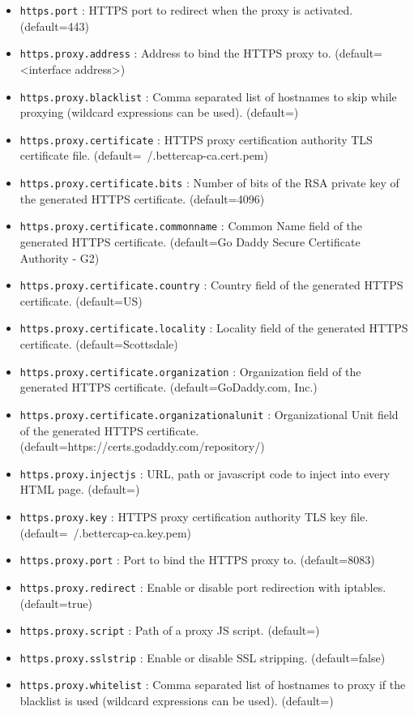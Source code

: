 \documentclass[status=normal,cover=tesi,language=en]{gmeepd}
\begin{document}
\begin{itemize}
 \item \verb|https.port| : HTTPS port to redirect when the proxy is activated. (default=443)
 \item \verb|https.proxy.address| : Address to bind the HTTPS proxy to. (default=<interface address>)
 \item \verb|https.proxy.blacklist| : Comma separated list of hostnames to skip while proxying (wildcard expressions can be used). (default=)
 \item \verb|https.proxy.certificate| : HTTPS proxy certification authority TLS certificate file. (default=~/.bettercap-ca.cert.pem)
 \item \verb|https.proxy.certificate.bits| : Number of bits of the RSA private key of the generated HTTPS certificate. (default=4096)
 \item \verb|https.proxy.certificate.commonname| : Common Name field of the generated HTTPS certificate. (default=Go Daddy Secure Certificate Authority - G2)
 \item \verb|https.proxy.certificate.country| : Country field of the generated HTTPS certificate. (default=US)
 \item \verb|https.proxy.certificate.locality| : Locality field of the generated HTTPS certificate. (default=Scottsdale)
 \item \verb|https.proxy.certificate.organization| : Organization field of the generated HTTPS certificate. (default=GoDaddy.com, Inc.)
 \item \verb|https.proxy.certificate.organizationalunit| : Organizational Unit field of the generated HTTPS certificate. \newline(default=https://certs.godaddy.com/repository/)
 \item \verb|https.proxy.injectjs| : URL, path or javascript code to inject into every HTML page. (default=)
 \item \verb|https.proxy.key| : HTTPS proxy certification authority TLS key file. (default=~/.bettercap-ca.key.pem)
 \item \verb|https.proxy.port| : Port to bind the HTTPS proxy to. (default=8083)
 \item \verb|https.proxy.redirect| : Enable or disable port redirection with iptables. (default=true)
 \item \verb|https.proxy.script| : Path of a proxy JS script. (default=)
 \item \verb|https.proxy.sslstrip| : Enable or disable SSL stripping. (default=false)
 \item \verb|https.proxy.whitelist| : Comma separated list of hostnames to proxy if the blacklist is used (wildcard expressions can be used). (default=)
\end{itemize}
\end{document}
